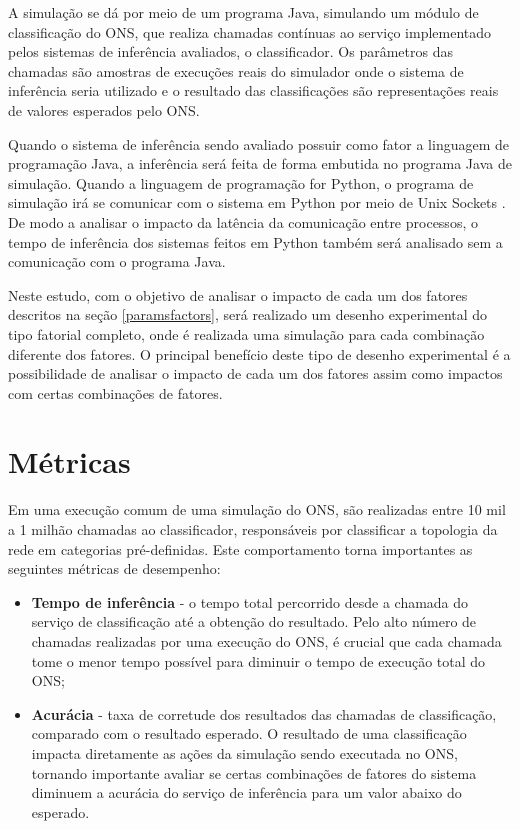 A simulação se dá por meio de um programa Java, simulando um módulo de classificação do ONS, que realiza chamadas contínuas ao serviço implementado pelos sistemas de inferência avaliados, o classificador. Os parâmetros das chamadas são amostras de execuções reais do simulador onde o sistema de inferência seria utilizado e o resultado das classificações são representações reais de valores esperados pelo ONS.

Quando o sistema de inferência sendo avaliado possuir como fator a linguagem de programação Java, a inferência será feita de forma embutida no programa Java de simulação. Quando a linguagem de programação for Python, o programa de simulação irá se comunicar com o sistema em Python por meio de Unix Sockets \cite{unix}. De modo a analisar o impacto da latência da comunicação entre processos, o tempo de inferência dos sistemas feitos em Python também será analisado sem a comunicação com o programa Java.

Neste estudo, com o objetivo de analisar o impacto de cada um dos fatores descritos na seção \ref{paramsfactors}, será realizado um desenho experimental do tipo fatorial completo, onde é realizada uma simulação para cada combinação diferente dos fatores. O principal benefício deste tipo de desenho experimental é a possibilidade de analisar o impacto de cada um dos fatores assim como impactos com certas combinações de fatores.


\section{Métricas}

Em uma execução comum de uma simulação do ONS, são realizadas entre 10 mil a 1 milhão chamadas ao classificador, responsáveis por classificar a topologia da rede em categorias pré-definidas. Este comportamento torna importantes as seguintes métricas de desempenho:

\begin{itemize}
  \item \textbf{Tempo de inferência} - o tempo total percorrido desde a chamada do serviço de classificação até a obtenção do resultado. Pelo alto número de chamadas realizadas por uma execução do ONS, é crucial que cada chamada tome o menor tempo possível para diminuir o tempo de execução total do ONS;
  \item \textbf{Acurácia} - taxa de corretude dos resultados das chamadas de classificação, comparado com o resultado esperado. O resultado de uma classificação impacta diretamente as ações da simulação sendo executada no ONS, tornando importante avaliar se certas combinações de fatores do sistema diminuem a acurácia do serviço de inferência para um valor abaixo do esperado.
\end{itemize}

